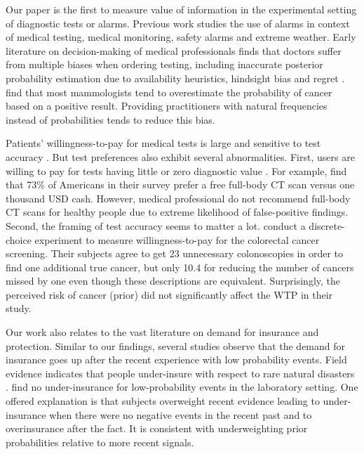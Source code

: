 \documentclass[12pt,a4paper]{article}
\begin{document}
Our paper is the first to measure value of information in the experimental setting of diagnostic tests or alarms. Previous work studies the use of alarms in context of medical testing, medical monitoring, safety alarms and extreme weather. Early literature on decision-making of medical professionals finds that doctors suffer from multiple biases when ordering testing, including  inaccurate posterior probability estimation due to availability heuristics, hindsight bias and regret \citep{bornstein_rationality_2001}. \citet{gigerenzer_helping_2007} find that most mammologists tend to overestimate the probability of cancer based on a positive result. Providing practitioners with natural frequencies instead of probabilities tends to reduce this bias.  

Patients' willingness-to-pay for medical tests is large and sensitive to test accuracy \citep{liang_acceptability_2003, howard_does_2009, neumann_willingness--pay_2012}. But test preferences also exhibit several abnormalities. First, users are willing to pay for tests having little or zero diagnostic value \citep{schwartz_enthusiasm_2004, neumann_willingness--pay_2012}. For example, \citet{schwartz_enthusiasm_2004} find that 73\% of Americans in their survey prefer a free full-body CT scan versus one thousand USD cash. However, medical professional do not recommend full-body CT scans for healthy people due to extreme likelihood of false-positive findings. Second, the framing of test accuracy seems to matter a lot. \citet{howard_does_2009} conduct a discrete-choice experiment to measure willingness-to-pay for the colorectal cancer screening. Their subjects agree to get 23 unnecessary colonoscopies in order to find one additional true cancer, but only 10.4 for reducing the number of cancers missed by one even though these descriptions are equivalent. Surprisingly, the perceived risk of cancer (prior) did not significantly affect the WTP in their study.

Our work also relates to the vast literature on demand for insurance and protection. Similar to our findings, several studies observe that the demand for insurance goes up after the recent experience with low probability events. Field evidence indicates that people under-insure with respect to rare natural disasters \citep{friedl_insurance_2014}. \citet{laury_insurance_2009} find no under-insurance for low-probability events in the laboratory setting. One offered explanation \citep{volkman-wise_representativeness_2015} is that subjects overweight recent evidence leading to under-insurance when there were no negative events in the recent past and to overinsurance after the fact. It is consistent with underweighting prior probabilities relative to more recent signals. 
\end{document}
